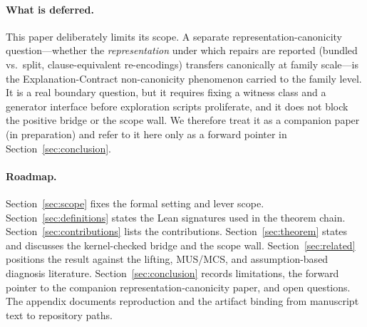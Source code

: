 \paragraph{What is deferred.}
This paper deliberately limits its scope.
A separate representation-canonicity question---whether the \emph{representation} under which repairs are reported (bundled vs.\ split, clause-equivalent re-encodings) transfers canonically at family scale---is the Explanation-Contract non-canonicity phenomenon carried to the family level.
It is a real boundary question, but it requires fixing a witness class and a generator interface before exploration scripts proliferate, and it does not block the positive bridge or the scope wall.
We therefore treat it as a companion paper (in preparation) and refer to it here only as a forward pointer in Section~\ref{sec:conclusion}.

\paragraph{Roadmap.}
Section~\ref{sec:scope} fixes the formal setting and lever scope.
Section~\ref{sec:definitions} states the Lean signatures used in the theorem chain.
Section~\ref{sec:contributions} lists the contributions.
Section~\ref{sec:theorem} states and discusses the kernel-checked bridge and the scope wall.
Section~\ref{sec:related} positions the result against the lifting, MUS/MCS, and assumption-based diagnosis literature.
Section~\ref{sec:conclusion} records limitations, the forward pointer to the companion representation-canonicity paper, and open questions.
The appendix documents reproduction and the artifact binding from manuscript text to repository paths.
